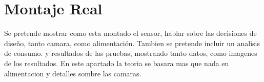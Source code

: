 \section{Montaje Real}

Se pretende mostrar como esta montado el sensor, hablar sobre las decisiones de diseño, tanto
camara, como alimentación. Tambien se pretende incluir un analisis de consumo. y resultados de las pruebas, mostrando tanto datos, como imagenes de los resultados. En este apartado la teoria se basara mas que nada en alimentacion y detalles sombre las camaras. \\


